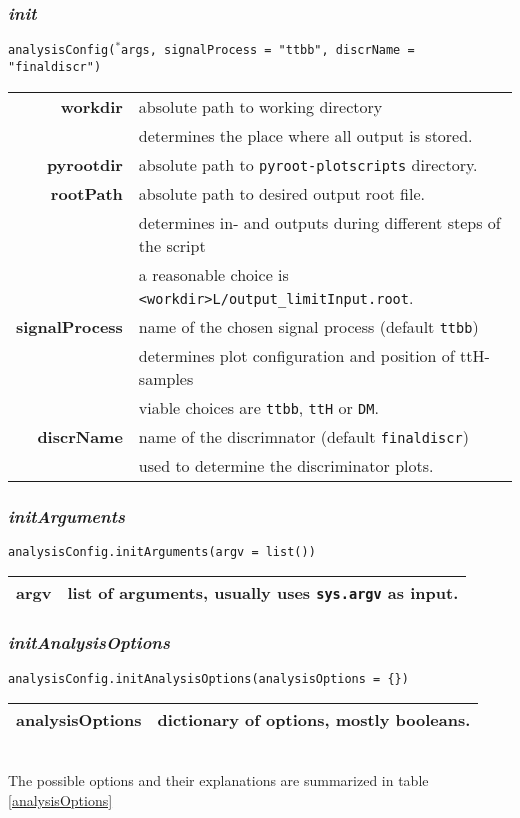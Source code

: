 \documentclass[12pt, a4paper]{article}
\newcommand{\args}{$^*$args}
\begin{document}
\subsubsection{\textit{init}}
\texttt{analysisConfig(\args, signalProcess = "ttbb", discrName = "finaldiscr")}\\
\begin{tabular}{r|l}
\hline
\textbf{workdir} 		& absolute path to working directory\\ 
						& determines the place where all output is stored. \\

\textbf{pyrootdir} 		& absolute path to \texttt{pyroot-plotscripts} directory. \\

\textbf{rootPath} 		& absolute path to desired output root file. \\ 
						& determines in- and outputs during different steps of the script \\
						& a reasonable choice is \texttt{<workdir>L/output\_limitInput.root}. \\

\textbf{signalProcess} 	& name of the chosen signal process (default \texttt{ttbb}) \\
						& determines plot configuration and position of ttH-samples \\ 
						& viable choices are \texttt{ttbb}, \texttt{ttH} or \texttt{DM}.\\

\textbf{discrName} 		& name of the discrimnator (default \texttt{finaldiscr}) \\ 
						& used to determine the discriminator plots.\\
\hline
\end{tabular}

\subsubsection{\textit{initArguments}}
\texttt{analysisConfig.initArguments(argv = list())}\\
\begin{tabular}{r|l}
\hline
\textbf{argv}	& list of arguments, usually uses \texttt{sys.argv} as input. \\
\hline
\end{tabular}

\subsubsection{\textit{initAnalysisOptions}}
\texttt{analysisConfig.initAnalysisOptions(analysisOptions = \{\})}\\
\begin{tabular}{r|l}
\hline
\textbf{analysisOptions}	& dictionary of options, mostly booleans.\\
\hline
\end{tabular}
\\
The possible options and their explanations are summarized in table \ref{analysisOptions}
\end{document}
